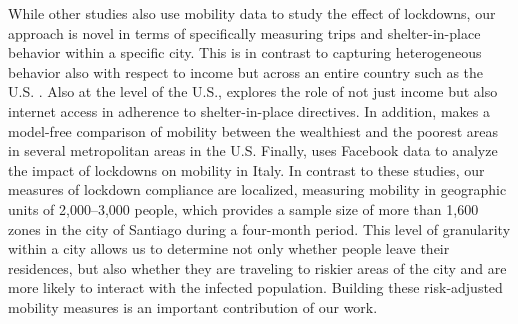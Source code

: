 While other studies also use mobility data to study the effect of lockdowns, our approach is novel in terms of specifically measuring trips and shelter-in-place behavior within a specific city. This is in contrast to capturing heterogeneous behavior also with respect to income but across an entire country such as the U.S. \citep{weill2020social}. Also at the level of the U.S., \cite{chiou2020social} explores the role of not just income but also internet access in adherence to shelter-in-place directives. In addition, \cite{valentino2020location} makes a model-free comparison of mobility between the wealthiest and the poorest areas in several metropolitan areas in the U.S. Finally, \cite{bonaccorsi2020economic} uses Facebook data to analyze the impact of lockdowns on mobility in Italy.
In contrast to these studies, our measures of lockdown compliance are localized, measuring mobility in geographic units of 2,000--3,000 people, which provides a sample size of more than 1,600 zones in the city of Santiago during a four-month period. This level of granularity within a city allows us to determine not only whether people leave their residences, but also whether they are traveling to riskier areas of the city and are more likely to interact with the infected population. Building these risk-adjusted mobility measures is an important contribution of our work. 
 
